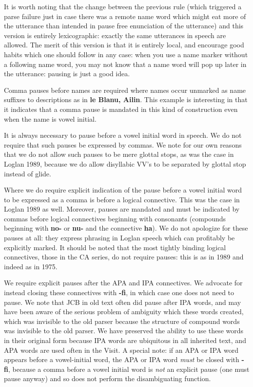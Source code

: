 \documentclass[12pt]{book}
\begin{document}
{It is worth noting that the change between the previous rule (which triggered a parse failure just in case there was a remote name word which might eat more of the utterance than intended in pause free enunciation of the utterance) and this version is entirely lexicographic:  exactly the same utterances in speech are allowed.  The merit of this version is that it is entirely local, and encourage good habits which one should follow in any case:  when you use a name marker without a following name word, you may not know that a name word will pop up later in the utterance:  pausing is just a good idea.

Comma pauses before names are required where names occur unmarked as name suffixes to descriptions as in {\bf le Blanu, Ailin}.  This example is interesting in that it indicates that a comma pause is mandated in this kind of construction even when the name is vowel initial.

It is always necessary to pause before a vowel initial word in speech.  We do not require that such pauses be expressed by commas.  We note for our own reasons that we do not allow such pauses to be mere glottal stops, as was the case in Loglan 1989, because we do allow disyllabic VV's to be separated by glottal stop instead of glide.

Where we do require explicit indication of the pause before a vowel initial word to be expressed as a comma is before a logical connective.  This was the case in Loglan 1989 as well.  Moreover, pauses are mandated and must be indicated by commas before logical connectives beginning with consonants (compounds beginning with {\bf no-} or {\bf nu-} and the connective {\bf ha}).  We do not apologize for these pauses at all:  they express phrasing in Loglan speech which can profitably be explicitly marked.  It should be noted that the most tightly binding logical connectives, those in the CA series, do not require pauses:  this is as in 1989 and indeed as in 1975.

We require explicit pauses after the APA and IPA connectives.  We advocate for instead closing these connectives with {\bf -fi}, in which case one does not need to pause.  We note that JCB in old text often did pause after IPA words, and may have been aware of the serious problem of ambiguity which these words created, which was invisible to the old parser because the structure of compound words was invisible to the old parser.  We have preserved the ability to use these words in their original form because IPA words are ubiquitous in all inherited text, and APA words are used often in the Visit.  A special note:  if an APA or IPA word appears before a vowel-initial word, the APA or IPA word {\em must\/} be closed with {\bf -fi}, because a comma before a vowel initial word is {\em not\/} an explicit pause (one must pause anyway) and so does not perform the disambiguating function.

}
\end{document}

